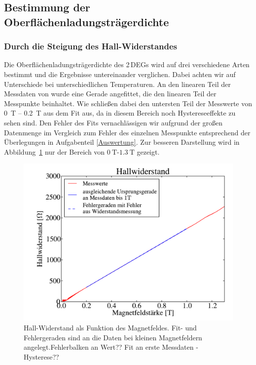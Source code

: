 \documentclass[paper=a4,fontsize=10pt,DIV=18,twocolumn,parskip=half]{scrartcl}
\numberwithin{equation}{section}    %
\renewcommand{\note}[1]{{\color{red}#1??}}
\newcommand{\kor}[1]{{\color{darkgreen}#1}}
\begin{document}
\subsection{Bestimmung der Oberflächenladungsträgerdichte}
\label{a2}
\subsubsection*{Durch die Steigung des Hall-Widerstandes}
Die Oberflächenladungsträgerdichte des 2\,DEGs wird auf drei verschiedene Arten bestimmt und die Ergebnisse untereinander verglichen. Dabei achten wir auf Unterschiede bei unterschiedlichen Temperaturen. 
\kor{
An den linearen Teil der Messdaten von wurde eine Gerade angefittet, die den linearen Teil der Messpunkte beinhaltet. Wie schließen dabei den untersten Teil der Messwerte von \SI{0}{\tesla} \--- \SI{0.2}{\tesla} aus dem Fit aus, da in diesem Bereich noch Hystereseeffekte zu sehen sind. Den Fehler des Fits vernachlässigen wir aufgrund der großen Datenmenge im Vergleich zum Fehler des einzelnen Messpunkte entsprechend der Überlegungen in Aufgabenteil \ref{Auswertung}. Zur besseren Darstellung wird in Abbildung~\ref{hallsteigung} nur der Bereich von $\SI{0}{\tesla}$\--$\SI{1.3}{\tesla}$ gezeigt.
}
\begin{figure}[htp]
	\begin{center}
		\includegraphics[width=\columnwidth]{Data-Plots/02-Hallsteigung.pdf}
		\caption{\kor{Hall-Widerstand als Funktion des Magnetfeldes. Fit- und Fehlergeraden sind an die Daten bei kleinen Magnetfeldern angelegt.}\note{Fehlerbalken an Wert} \note{Fit an erste Messdaten - Hysterese}}
		\label{hallsteigung}
	\end{center}
\end{figure}
\end{document}
